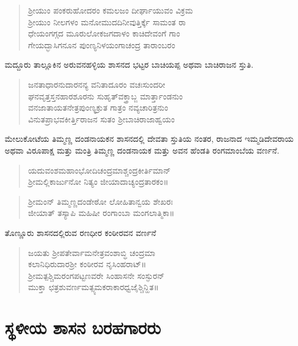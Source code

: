 \begin{verse}
ಶ‍್ರೀಯುಂ ಪಂಕರುಹೋದರಂ ಕಮಲಜಂ ದೀರ್ಘಾಯುವಂ ವಿಕ್ರಮ \\ ಶ‍್ರೀಯುಂ ನೀಲಗಳಂ ಮನೋಮುದದಿನೀವುತ್ತಿರ್ಕ್ಕೆ ಸಾಮಂತ ರಾ \\ ಧೇಯಂಗಗ್ಗದ ಮೂರುಲೋಕಜಗದಾಳಂ ಕಾಚಿದೇವಂಗೆ ಗಾಂ \\ ಗೇಯದ್ಭಾಸಿಗನೂನ ಪುಂಣ್ಯನಿಳಯಂಗಾಚಂದ್ರ ತಾರಾಂಬರಂ
\end{verse}

ಮದ್ದೂರು ತಾಲ್ಲೂಕಿನ ಅರುವನಹಳ್ಳಿಯ ಶಾಸನದ ಭಟ್ಟರ ಬಾಚಿಯಪ್ಪ ಅಥವಾ ಬಾಚಿರಾಜನ ಸ್ತುತಿ.

\begin{verse}
ಜನತಾಧಾರನುದಾರನನ್ಯ ವನಿತಾದೂರಂ ವಚಃಸುಂದರೀ\\ ಘನವೃತ್ತಸ್ತನಹಾರಶೂರನು ಸುಹೃತ್​ವಕ್ತ್ರಾಬ್ಜ ಮಾರ್ತ್ತಾಂಡನುಂ \\ ವನಜಾತಾಯತನೇತ್ರಪುಂಣ್ಯಕ್ರುತ ಗಾತ್ರಂ ನವ್ಯಚಾರಿತ್ರನುಂ \\ ವಿನುತಪ್ರಾಭವಕೀರ್ತ್ತಿರಾಜನ ಸುತಂ ಶ‍್ರೀಬಾಚಿರಾಜಾಹ್ವಯಂ
\end{verse}

ಮೇಲುಕೋಟೆಯ ತಿಮ್ಮಣ್ಣ ದಂಡನಾಯಕನ ಶಾಸನದಲ್ಲಿ ದೇವತಾ ಸ್ತುತಿಯ ನಂತರ, ರಾಜನಾದ ಇಮ್ಮಡಿದೇವರಾಯ ಅಥವಾ ವಿರೂಪಾಕ್ಷ ಮತ್ತು ಮಂತ್ರಿ ತಿಮ್ಮಣ್ಣ ದಂಡನಾಯಕ ಮತ್ತು ಅವನ ಹೆಂಡತಿ ರಂಗಮಾಂಬೆಯ ವರ್ಣನೆ.

\begin{verse}
ಯದುವಂಶಮಹಾಂಭೋದಿಚಂದ್ರಮಾಶ್ಚಂದ್ರಕೀರ್ತಿಮಾನ್​ \\ ಶ‍್ರೀಮಲ್ಲಿಕಾರ್ಜುನೋ ನಿತ್ಯಂ ಜೀಯಾದಾಚ್ಯಂದ್ರತಾರಕಂ॥
\end{verse}

\begin{verse}
ಶ‍್ರೀಮಂನ್​ ತಿಮ್ಮಣ್ಣದಂಡೇಠೋ ಲೋಹಿತಾನ್ವಯ ಶೇಖರಃ \\ ಜೀಯಾತ್​ ತಸ್ಯಾಪಿ ಮಹಿಷೀ ರಂಗಾಂಬಾ ಮಂಗಲಾತ್ಮಿಕಾ॥
\end{verse}

ತೊಣ್ಣೂರು ಶಾಸನದಲ್ಲಿರುವ ರಣಧೀರ ಕಂಠೀರವನ ವರ್ಣನೆ

\begin{verse}
ಜಯತು ಶ‍್ರೀಪತೇರ್ವಾಮನೇತ್ರವಂಶಾಬ್ಧಿ ಚಂದ್ರಮಾ \\ ಕಲಾನಿಧಿರುದಾರಶ‍್ರೀ ಕಂಠೀರವ ನೃಸಿಂಹರಾಟ್​॥ \\ ಶ‍್ರೀಮತ್ಪಶ್ಚಿಮರಂಗಪಟ್ಟಣವರೇ ಸಿಂಹಾಸನೇ ಸಂಸ್ಫುರನ್​ \\ ಮುಕ್ತಾ ಛತ್ರಶುವರ್ಣಮತ್ಸ್ಯಮಕರಾಕಾರಧ್ವಜೈಶ್ಚಿನ್ಹಿತ॥
\end{verse}


\section{ಸ್ಥಳೀಯ ಶಾಸನ ಬರಹಗಾರರು}

